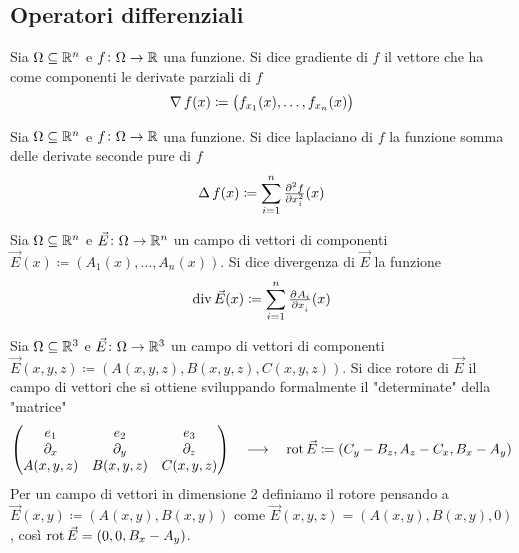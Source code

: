 \subsection{Operatori differenziali}

\begin{definition}[gradiente]
	Sia $ \Omega \subseteq \mathbb{R}^n $ e $ f \colon \Omega \to \mathbb{R} $ una funzione. Si dice gradiente di $ f $ il vettore che ha come componenti le derivate parziali di $ f $
	\begin{equation}
		\operatorname{\nabla}{f}(x) \coloneqq \left(f_{x_1}(x), \ldots , f_{x_n}(x)\right)
	\end{equation}
\end{definition}

\begin{definition}[laplaciano]
	Sia $ \Omega \subseteq \mathbb{R}^n $ e $ f \colon \Omega \to \mathbb{R} $ una funzione. Si dice laplaciano di $ f $ la funzione somma delle derivate seconde pure di $ f $
	\begin{equation}
		\lap{f}(x) \coloneqq \sum_{i = 1}^{n} \pd[2]{f}{x_i}(x)
	\end{equation}
\end{definition}

\begin{definition}[laplaciano]
	Sia $ \Omega \subseteq \mathbb{R}^n $ e $ \vec{E} \colon \Omega \to \mathbb{R}^n $ un campo di vettori di componenti $ \vec{E}(x) \coloneqq (A_1(x), \ldots, A_n(x)) $. Si dice divergenza di $ \vec{E} $ la funzione 
	\begin{equation}
		\div{\vec{E}}(x) \coloneqq \sum_{i = 1}^{n} \pd{A_i}{x_i}(x)
	\end{equation}
\end{definition}

\begin{definition}[rotore]
	Sia $ \Omega \subseteq \mathbb{R}^3 $ e $ \vec{E} \colon \Omega \to \mathbb{R}^3 $ un campo di vettori di componenti $ \vec{E}(x, y, z) \coloneqq (A(x, y, z), B(x, y, z), C(x, y, z)) $. Si dice rotore di $ \vec{E} $ il campo di vettori che si ottiene sviluppando formalmente il "determinate" della "matrice"
	\begin{equation}
		\begin{pmatrix}
			e_1 & e_2 & e_3 \\
			\partial_x & \partial_y & \partial_z \\
			A(x, y, z) & B(x, y, z) & C(x, y, z)
		\end{pmatrix}
		\quad \longrightarrow \quad 
		\operatorname{rot}{\vec{E}} \coloneqq (C_y - B_z, A_z - C_x, B_x - A_y)
	\end{equation}
	Per un campo di vettori in dimensione 2 definiamo il rotore pensando a $ \vec{E}(x, y) \coloneqq (A(x, y), B(x, y)) $ come $ \vec{E}(x, y, z) = (A(x, y), B(x, y), 0) $, così $ \operatorname{rot}{\vec{E}} = (0, 0, B_x - A_y) $. 
\end{definition}

